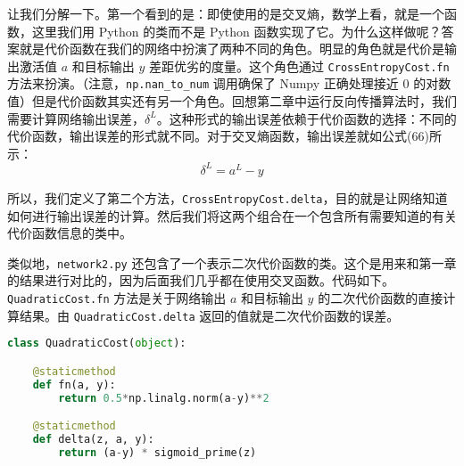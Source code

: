 让我们分解一下。第一个看到的是：即使使用的是交叉熵，数学上看，就是一个函数，这里我们用 Python 的类而不是 Python 函数实现了它。为什么这样做呢？答案就是代价函数在我们的网络中扮演了两种不同的角色。明显的角色就是代价是输出激活值 $a$ 和目标输出 $y$ 差距优劣的度量。这个角色通过 \lstinline!CrossEntropyCost.fn! 方法来扮演。（注意，\lstinline!np.nan_to_num! 调用确保了 Numpy 正确处理接近 $0$ 的对数值）但是代价函数其实还有另一个角色。回想第二章中运行反向传播算法时，我们需要计算网络输出误差，$\delta^L$。这种形式的输出误差依赖于代价函数的选择：不同的代价函数，输出误差的形式就不同。对于交叉熵函数，输出误差就如公式(66)所示：
\begin{equation}
  \delta^L = a^L-y
  \label{eq:99}\tag{99}
\end{equation}

所以，我们定义了第二个方法，\lstinline!CrossEntropyCost.delta!，目的就是让网络知道如何进行输出误差的计算。然后我们将这两个组合在一个包含所有需要知道的有关代价函数信息的类中。

类似地，\lstinline!network2.py! 还包含了一个表示二次代价函数的类。这个是用来和第一章的结果进行对比的，因为后面我们几乎都在使用交叉函数。代码如下。\lstinline!QuadraticCost.fn! 方法是关于网络输出 $a$ 和目标输出 $y$ 的二次代价函数的直接计算结果。由 \lstinline!QuadraticCost.delta! 返回的值就是二次代价函数的误差。
\begin{lstlisting}[language=Python]
class QuadraticCost(object):

    @staticmethod
    def fn(a, y):
        return 0.5*np.linalg.norm(a-y)**2

    @staticmethod
    def delta(z, a, y):
        return (a-y) * sigmoid_prime(z)
\end{lstlisting}

